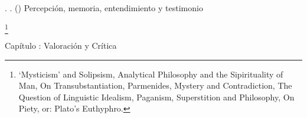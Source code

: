 \documentclass[11pt]{article}
\begin{document}
{\begin{spacing}{1.5}
\tab \tab \tab {}. 
. 
()
Percepción, memoria, entendimiento y testimonio

\tab {}
\footnote{
`Mysticism' and Solipsism, 
Analytical Philosophy and the Sipirituality of Man, 
On Transubstantiation, 
Parmenides, Mystery and Contradiction, 
The Question of Linguistic Idealism, 
Paganism, Superstition and Philosophy, 
On Piety, or: Plato's Euthyphro.
}

{\LARGE Capítulo : 
Valoración y Crítica}




\end{spacing}
}
\end{document}
